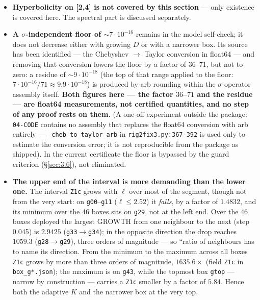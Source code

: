 \begin{itemize}
\item \textbf{Hyperbolicity on [2,4] is not covered by this section} --- only existence is covered here. The spectral part is discussed separately.
\item \textbf{A $\sigma$-independent floor of $\sim 7\cdot 10^{-16}$} remains in the model self-check; it does not decrease either with growing $D$ or with a narrower box. Its source has been identified --- the Chebyshev $\to$ Taylor conversion in float64 --- and removing that conversion lowers the floor by a factor of 36--71, but not to zero: a residue of $\sim 9\cdot 10^{-18}$ (the top of that range applied to the floor: $7\cdot 10^{-16}/71 \approx 9.9\cdot 10^{-18}$) is produced by arb rounding within the $\sigma$-operator assembly itself. \textbf{Both figures here --- the factor $36$--$71$ and the residue --- are float64 measurements, not certified quantities, and no step of any proof rests on them.} (A one-off experiment outside the package: \texttt{04-CODE} contains no assembly that replaces the float64 conversion with arb entirely --- \texttt{\_\allowbreak cheb\_\allowbreak to\_\allowbreak taylor\_\allowbreak arb} in \texttt{rig2fix3.py:367-392} is used only to estimate the conversion error; it is not reproducible from the package as shipped). In the current certificate the floor is bypassed by the guard criterion (\S\ref{sec:3.6}), not eliminated.
\item \textbf{The upper end of the interval is more demanding than the lower one.} The interval \texttt{Z1c} grows with $\ell$ over most of the segment, though not from the very start: on \texttt{g00}--\texttt{g11} ($\ell\le 2.52$) it \emph{falls}, by a factor of $1.4832$, and its minimum over the 46 boxes sits on \texttt{g29}, not at the left end. Over the 46 boxes deployed the largest GROWTH from one neighbour to the next (step 0.045) is $2.9425$ (\texttt{g33}$\to$\texttt{g34}); in the opposite direction the drop reaches $1059.3$ (\texttt{g28}$\to$\texttt{g29}), three orders of magnitude --- so ``ratio of neighbours has to name its direction. From the minimum to the maximum across all boxes \texttt{Z1c} grows by more than three orders of magnitude, $1635.6\times$ (field \texttt{Z1c} in \texttt{box\_g*.json}); the maximum is on \texttt{g43}, while the topmost box \texttt{gtop} --- narrow by construction --- carries a \texttt{Z1c} smaller by a factor of $5.84$. Hence both the adaptive $K$ and the narrower box at the very top.
\end{itemize}

